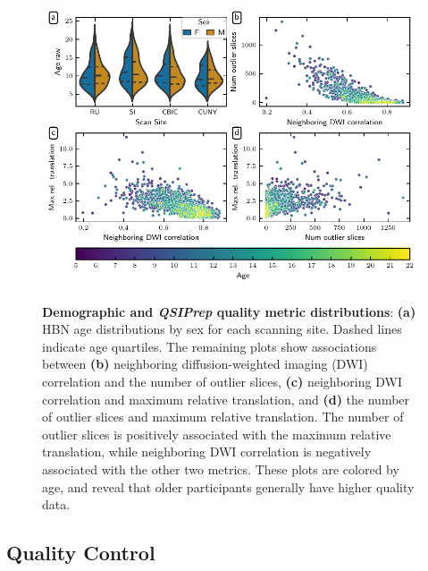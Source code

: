 \documentclass[fleqn,10pt,inline]{wlscirep}
\begin{document}
\begin{figure}[!h]
    {\label{fig:metric-dist:age}}
    {\label{fig:metric-dist:ndc-slices}}
    {\label{fig:metric-dist:ndc-translation}}
    {\label{fig:metric-dist:slices-translation}}
    \centering
    \includegraphics[width=\linewidth]{bundle-profiles/qsiprep-metric-distributions.pdf}
    \caption{%
        {\bf Demographic and \emph{QSIPrep} quality metric distributions}:
        \textbf{(a)} HBN age distributions by sex for each scanning site. Dashed lines
        indicate age quartiles.
        The remaining plots show associations between \textbf{(b)} neighboring
        diffusion-weighted imaging (DWI) correlation  \cite{yeh2019-kb} and the
        number of outlier slices, \textbf{(c)} neighboring DWI correlation and maximum relative
        translation, and \textbf{(d)} the number of outlier slices and maximum
        relative translation.
        The number of outlier slices is positively associated with the maximum
        relative translation, while neighboring DWI correlation is negatively associated with the other
        two metrics.
        These plots are colored by age, and reveal that older participants
        generally have higher quality data.
    }
    \label{fig:metric-dist}
\end{figure}

\subsection*{Quality Control}
\end{document}
